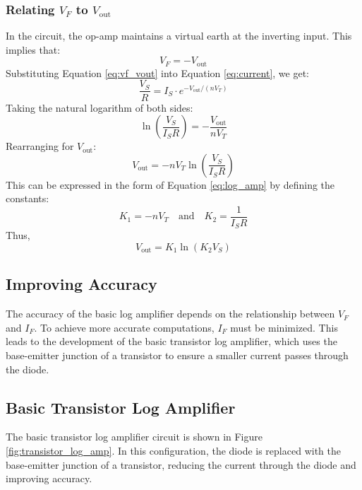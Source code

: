 \documentclass[a4paper,9pt,twoside,openany,twocolumn]{memoir}
\begin{document}
\subsubsection{Relating \(V_F\) to \(V_{\text{out}}\)}
In the circuit, the op-amp maintains a virtual earth at the inverting input. This implies that:
\begin{equation}
V_F = -V_{\text{out}}
\label{eq:vf_vout}
\end{equation}
Substituting Equation \ref{eq:vf_vout} into Equation \ref{eq:current}, we get:
\begin{equation}
\frac{V_S}{R} = I_S \cdot e^{-V_{\text{out}}/(nV_T)}
\label{eq:final}
\end{equation}
Taking the natural logarithm of both sides:
\begin{equation}
\ln\left(\frac{V_S}{I_S R}\right) = -\frac{V_{\text{out}}}{nV_T}
\label{eq:log_relation}
\end{equation}
Rearranging for \(V_{\text{out}}\):
\begin{equation}
V_{\text{out}} = -nV_T \ln\left(\frac{V_S}{I_S R}\right)
\label{eq:vout_final}
\end{equation}
This can be expressed in the form of Equation \ref{eq:log_amp} by defining the constants:
\begin{equation}
K_1 = -nV_T \quad \text{and} \quad K_2 = \frac{1}{I_S R}
\end{equation}
Thus,
\begin{equation}
V_{\text{out}} = K_1 \ln(K_2 V_S)
\label{eq:general_log_amp}
\end{equation}

\subsection{Improving Accuracy}
The accuracy of the basic log amplifier depends on the relationship between \(V_F\) and \(I_F\). To achieve more accurate computations, \(I_F\) must be minimized. This leads to the development of the basic transistor log amplifier, which uses the base-emitter junction of a transistor to ensure a smaller current passes through the diode.

\subsection{Basic Transistor Log Amplifier}
The basic transistor log amplifier circuit is shown in Figure \ref{fig:transistor_log_amp}. In this configuration, the diode is replaced with the base-emitter junction of a transistor, reducing the current through the diode and improving accuracy.
\end{document}
